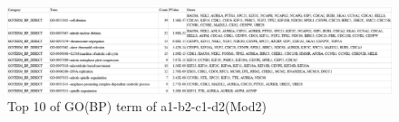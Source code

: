 \documentclass[utf8]{frontiersSCNS} %
\begin{document}
\begin{figure}
	\centering
	\includegraphics[width=0.98\linewidth]{FIG/screenshot004}
	\caption{Top 10 of GO(BP) term of a1-b2-c1-d2(Mod2)}
	\label{fig:screenshot004}
\end{figure}



\end{document}
